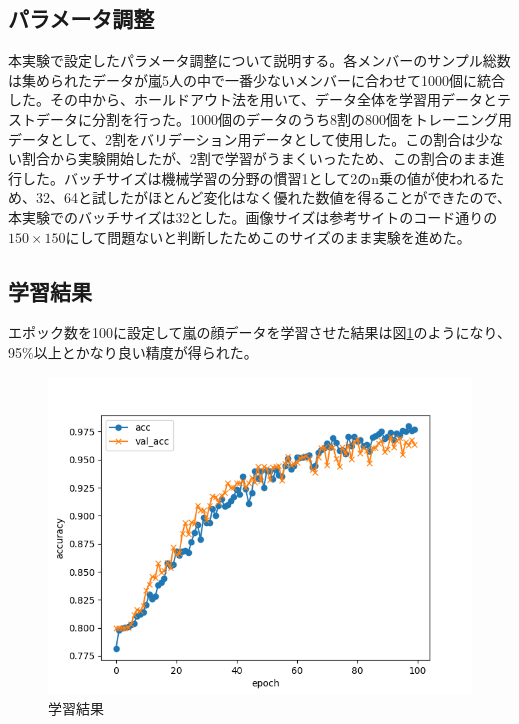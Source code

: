 \documentclass[a4paper, 11pt, titlepage]{jsarticle}
\begin{document}
\subsection{パラメータ調整}
本実験で設定したパラメータ調整について説明する。各メンバーのサンプル総数は集められたデータが嵐5人の中で一番少ないメンバーに合わせて1000個に統合した。その中から、ホールドアウト法を用いて、データ全体を学習用データとテストデータに分割を行った。1000個のデータのうち8割の800個をトレーニング用データとして、2割をバリデーション用データとして使用した。この割合は少ない割合から実験開始したが、2割で学習がうまくいったため、この割合のまま進行した。バッチサイズは機械学習の分野の慣習1として2のn乗の値が使われるため、32、64と試したがほとんど変化はなく優れた数値を得ることができたので、本実験でのバッチサイズは32とした。画像サイズは参考サイトのコード通りの$150\times 150$にして問題ないと判断したためこのサイズのまま実験を進めた。

\subsection{学習結果}
エポック数を100に設定して嵐の顔データを学習させた結果は図\ref{fig1}のようになり、95\%以上とかなり良い精度が得られた。

\begin{figure}[htbp]
 \centering
  \includegraphics[width=120mm]{graph1}
  \caption{学習結果}
  \label{fig1}
\end{figure}
\end{document}
